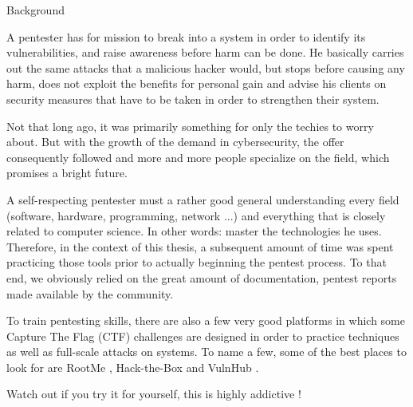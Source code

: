 \begin{chaptercover}{Background}
\begin{discussion}
A pentester has for mission to break into a system in order to identify its vulnerabilities, and raise awareness before harm can be done. He basically carries out the same attacks that a malicious hacker would, but stops before causing any harm, does not exploit the benefits for personal gain and advise his clients on security measures that have to be taken in order to strengthen their system.

Not that long ago, it was primarily something for only the techies to worry about. But with the growth of the demand in cybersecurity, the offer consequently followed and more and more people specialize on the field, which promises a bright future.

A self-respecting pentester must a rather good general understanding every field (software, hardware, programming, network ...) and everything that is closely related to computer science. In other words: master the technologies he uses. Therefore, in the context of this thesis, a subsequent amount of time was spent practicing those tools prior to actually beginning the pentest process. To that end, we obviously relied on the great amount of documentation, pentest reports made available by the community.

To train pentesting skills, there are also a few very good platforms in which some Capture The Flag (CTF) challenges are designed in order to practice techniques as well as full-scale attacks on systems. To name a few, some of the best places to look for are RootMe \cite{rootme}, Hack-the-Box \cite{hack-the-box} and VulnHub \cite{vulnhub}.

Watch out if you try it for yourself, this is highly addictive !
\end{discussion}

\end{chaptercover}
